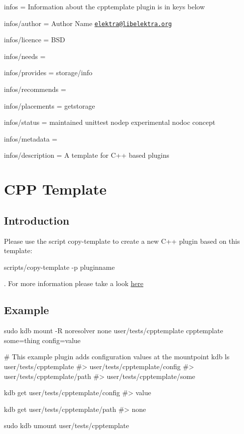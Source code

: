 
\begin{DoxyItemize}
\item infos = Information about the cpptemplate plugin is in keys below
\item infos/author = Author Name \href{mailto:elektra@libelektra.org}{\tt elektra@libelektra.\+org}
\item infos/licence = B\+SD
\item infos/needs =
\item infos/provides = storage/info
\item infos/recommends =
\item infos/placements = getstorage
\item infos/status = maintained unittest nodep experimental nodoc concept
\item infos/metadata =
\item infos/description = A template for C++ based plugins
\end{DoxyItemize}\hypertarget{md_src_plugins_cpptemplate_README_src_plugins_cpptemplate_README_md}{}\section{C\+P\+P Template}\label{md_src_plugins_cpptemplate_README_src_plugins_cpptemplate_README_md}
\subsection*{Introduction}

Please use the script copy-\/template to create a new C++ plugin based on this template\+:


\begin{DoxyCode}
scripts/copy-template -p pluginname
\end{DoxyCode}


. For more information please take a look \hyperlink{md_src_plugins_template_README_src_plugins_template_README_md}{here}

\subsection*{Example}


\begin{DoxyCode}
sudo kdb mount -R noresolver none user/tests/cpptemplate cpptemplate some=thing config=value

# This example plugin adds configuration values at the mountpoint
kdb ls user/tests/cpptemplate
#> user/tests/cpptemplate/config
#> user/tests/cpptemplate/path
#> user/tests/cpptemplate/some

kdb get user/tests/cpptemplate/config
#> value

kdb get user/tests/cpptemplate/path
#> none

sudo kdb umount user/tests/cpptemplate
\end{DoxyCode}
 